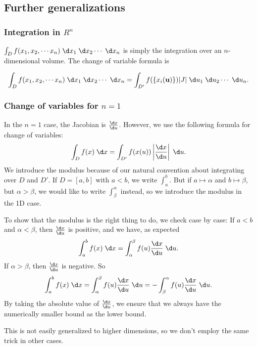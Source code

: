 \documentclass[a4paper]{article}
\begin{document}
\subsection{Further generalizations}
\subsubsection{Integration in \texorpdfstring{$R^n$}{Rn}}
$\int_D f(x_1, x_2, \cdots x_n)\;\d x_1 \;\d x_2\cdots\;\d x_n$ is simply the integration over an $n$-dimensional volume. The change of variable formula is
\begin{prop}
  \[
    \int_D f(x_1, x_2, \cdots x_n)\;\d x_1 \;\d x_2\cdots\;\d x_n = \int_{D'} f(\{x_i(\mathbf{u})\}) |J| \;\d u_1\;\d u_2\cdots\;\d u_n.
  \]
\end{prop}

\subsubsection{Change of variables for \texorpdfstring{$n = 1$}{n = 1}}
In the $n = 1$ case, the Jacobian is $\frac{\d x}{\d u}$. However, we use the following formula for change of variables:
\[
  \int_D f(x) \;\d x = \int_{D'} f(x(u))\left|\frac{\d x}{\d u}\right| \;\d u.
\]
We introduce the modulus because of our natural convention about integrating over $D$ and $D'$. If $D = [a, b]$ with $a < b$, we write $\int_a^b$. But if $a\mapsto \alpha$ and $b \mapsto \beta$, but $\alpha > \beta$, we would like to write $\int_\beta ^\alpha$ instead, so we introduce the modulus in the 1D case.

To show that the modulus is the right thing to do, we check case by case: If $a < b$ and $\alpha < \beta$, then $\frac{\d x}{\d u}$ is positive, and we have, as expected
\[
  \int_a^b f(x)\;\d x = \int_\alpha^\beta f(u)\frac{\d x}{\d u}\;\d u.
\]
If $\alpha > \beta$, then $\frac{\d x}{\d u}$ is negative. So
\[
  \int_a^b f(x)\;\d x = \int_\alpha^\beta f(u)\frac{\d x}{\d u}\;\d u = -\int_\beta^\alpha f(u)\frac{\d x}{\d u}\;\d u.
\]
By taking the absolute value of $\frac{\d x}{\d u}$, we ensure that we always have the numerically smaller bound as the lower bound.

This is not easily generalized to higher dimensions, so we don't employ the same trick in other cases.
\end{document}
